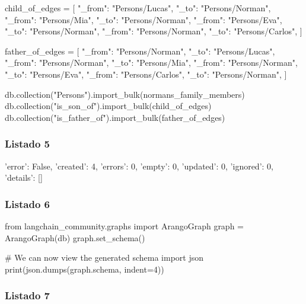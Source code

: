 \begin{APACode}
child_of_edges = [
    {"_from": "Persons/Lucas", "_to": "Persons/Norman"},
    {"_from": "Persons/Mia", "_to": "Persons/Norman"},
    {"_from": "Persons/Eva", "_to": "Persons/Norman"},
    {"_from": "Persons/Norman", "_to": "Persons/Carlos"},
]

father_of_edges = [
    {"_from": "Persons/Norman", "_to": "Persons/Lucas"},
    {"_from": "Persons/Norman", "_to": "Persons/Mia"},
    {"_from": "Persons/Norman", "_to": "Persons/Eva"},
    {"_from": "Persons/Carlos", "_to": "Persons/Norman"},
]

db.collection("Persons").import_bulk(normans_family_members)
db.collection("is_son_of").import_bulk(child_of_edges)
db.collection("is_father_of").import_bulk(father_of_edges)
\end{APACode}

\subsubsection{Listado 5}
\label{anexo:code-4-4-1-5}

\begin{APACode}
{'error': False,
 'created': 4,
 'errors': 0,
 'empty': 0,
 'updated': 0,
 'ignored': 0,
 'details': []}
\end{APACode}

\subsubsection{Listado 6}
\label{anexo:code-4-4-1-6}

\begin{APACode}
from langchain_community.graphs import ArangoGraph
graph = ArangoGraph(db)
graph.set_schema()

# We can now view the generated schema
import json
print(json.dumps(graph.schema, indent=4))
\end{APACode}

\subsubsection{Listado 7}
\label{anexo:code-4-4-1-7}

